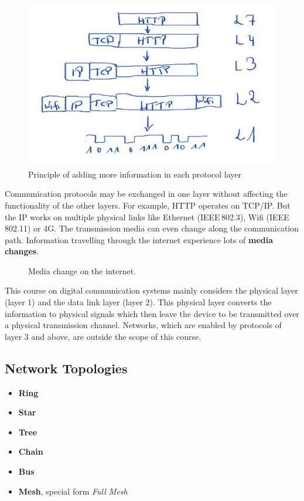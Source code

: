 \begin{figure}[H]
	\centering
	\includegraphics{../chapter01/Frame_Wrapping.jpg}
	\caption{Principle of adding more information in each protocol layer}
	\label{fig:ch01:frame_construction}
\end{figure}

Communication protocols may be exchanged in one layer without affecting the functionality of the other layers. For example, \ac{HTTP} operates on \acs{TCP}/\acs{IP}. But the \acf{IP} works on multiple physical links like Ethernet (IEEE\,802.3), Wifi (IEEE\,802.11) or 4G. The transmission media can even change along the communication path. Information travelling through the internet experience lots of  \textbf{media changes}.


\begin{figure}[H]
	\centering
	\caption{Media change on the internet. }
	\label{fig:ch01:media_changes}
\end{figure}

This course on digital communication systems mainly considers the physical layer (layer 1) and the data link layer (layer 2). This physical layer converts the information to physical signals which then leave the device to be transmitted over a physical transmission channel. Networks, which are enabled by protocols of layer 3 and above, are outside the scope of this course.


\subsection{Network Topologies}

\begin{itemize}
	\item \textbf{Ring}
	\item \textbf{Star}
	\item \textbf{Tree}
	\item \textbf{Chain}
	\item \textbf{Bus}
	\item \textbf{Mesh}, special form \emph{Full Mesh}
\end{itemize}

